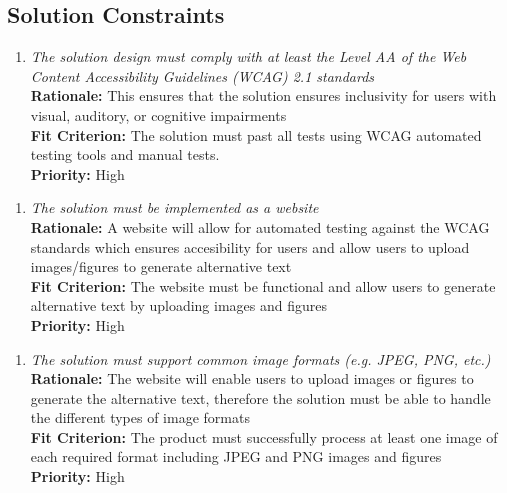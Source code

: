 \documentclass[12pt]{article}
\begin{document}
\subsection{Solution Constraints}
\begin{enumerate}[label=MD-SL \arabic*., wide=0pt, leftmargin=*]
  \item \emph{The solution design must comply with at least the Level AA of the Web Content Accessibility Guidelines (WCAG) 2.1 standards}\\[2mm]
    {\bf Rationale:} This ensures that the solution ensures inclusivity for users with visual, auditory, or cognitive impairments\\
    {\bf Fit Criterion:} The solution must past all tests using WCAG automated testing tools and manual tests.\\
    {\bf Priority:} High
\end{enumerate}
\begin{enumerate}[label=MD-SL \arabic*., wide=0pt, leftmargin=*]
  \item \emph{The solution must be implemented as a website}\\[2mm]
    {\bf Rationale:} A website will allow for automated testing against the WCAG standards which ensures accesibility for users 
    and allow users to upload images/figures to generate alternative text\\
    {\bf Fit Criterion:} The website must be functional and allow users to generate alternative text by uploading
    images and figures\\
    {\bf Priority:} High
\end{enumerate}
\begin{enumerate}[label=MD-SL \arabic*., wide=0pt, leftmargin=*]
  \item \emph{The solution must support common image formats (e.g. JPEG, PNG, etc.)}\\[2mm]
    {\bf Rationale:} The website will enable users to upload images or figures to generate the alternative text, therefore the solution must be able 
    to handle the different types of image formats\\
    {\bf Fit Criterion:} The product must successfully process at least one image of each required format including JPEG and PNG
    images and figures\\
    {\bf Priority:} High
\end{enumerate}
\end{document}
